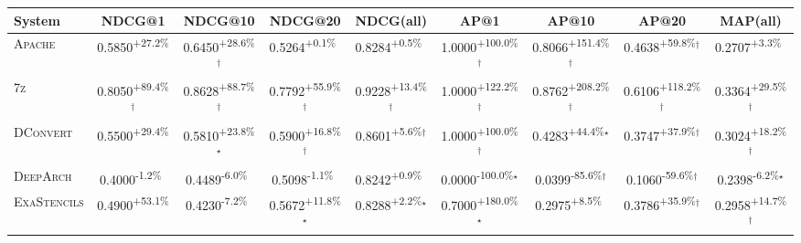 \begin{table}[htbp]
\centering
\renewcommand{\arraystretch}{1.2}
\begin{tabular}{l|cccc|cccc}
\hline
System & NDCG@1 & NDCG@10 & NDCG@20 & NDCG(all) & AP@1 & AP@10 & AP@20 & MAP(all) \\ \hline
\textsc{Apache} & \cellcolor{green!30}0.5850\textsuperscript{+27.2\%}$^{\,\,\,}$ & \cellcolor{green!30}0.6450\textsuperscript{+28.6\%}$^\dagger$ & \cellcolor{green!30}0.5264\textsuperscript{+0.1\%}$^{\,\,\,}$ & \cellcolor{green!30}0.8284\textsuperscript{+0.5\%}$^{\,\,\,}$ & \cellcolor{green!30}1.0000\textsuperscript{+100.0\%}$^\dagger$ & \cellcolor{green!30}0.8066\textsuperscript{+151.4\%}$^\dagger$ & \cellcolor{green!30}0.4638\textsuperscript{+59.8\%}$^\dagger$ & \cellcolor{green!30}0.2707\textsuperscript{+3.3\%}$^{\,\,\,}$ \\
\textsc{7z} & \cellcolor{green!30}0.8050\textsuperscript{+89.4\%}$^\dagger$ & \cellcolor{green!30}0.8628\textsuperscript{+88.7\%}$^\dagger$ & \cellcolor{green!30}0.7792\textsuperscript{+55.9\%}$^\dagger$ & \cellcolor{green!30}0.9228\textsuperscript{+13.4\%}$^\dagger$ & \cellcolor{green!30}1.0000\textsuperscript{+122.2\%}$^\dagger$ & \cellcolor{green!30}0.8762\textsuperscript{+208.2\%}$^\dagger$ & \cellcolor{green!30}0.6106\textsuperscript{+118.2\%}$^\dagger$ & \cellcolor{green!30}0.3364\textsuperscript{+29.5\%}$^\dagger$ \\
\textsc{DConvert} & \cellcolor{green!30}0.5500\textsuperscript{+29.4\%}$^{\,\,\,}$ & \cellcolor{green!30}0.5810\textsuperscript{+23.8\%}$^\star$ & \cellcolor{green!30}0.5900\textsuperscript{+16.8\%}$^\dagger$ & \cellcolor{green!30}0.8601\textsuperscript{+5.6\%}$^\dagger$ & \cellcolor{green!30}1.0000\textsuperscript{+100.0\%}$^\dagger$ & \cellcolor{green!30}0.4283\textsuperscript{+44.4\%}$^\star$ & \cellcolor{green!30}0.3747\textsuperscript{+37.9\%}$^\dagger$ & \cellcolor{green!30}0.3024\textsuperscript{+18.2\%}$^\dagger$ \\
\textsc{DeepArch} & \cellcolor{red!30}0.4000\textsuperscript{-1.2\%}$^{\,\,\,}$ & \cellcolor{red!30}0.4489\textsuperscript{-6.0\%}$^{\,\,\,}$ & \cellcolor{red!30}0.5098\textsuperscript{-1.1\%}$^{\,\,\,}$ & \cellcolor{green!30}0.8242\textsuperscript{+0.9\%}$^{\,\,\,}$ & \cellcolor{red!30}0.0000\textsuperscript{-100.0\%}$^\star$ & \cellcolor{red!30}0.0399\textsuperscript{-85.6\%}$^\dagger$ & \cellcolor{red!30}0.1060\textsuperscript{-59.6\%}$^\dagger$ & \cellcolor{red!30}0.2398\textsuperscript{-6.2\%}$^\star$ \\
\textsc{ExaStencils} & \cellcolor{green!30}0.4900\textsuperscript{+53.1\%}$^{\,\,\,}$ & \cellcolor{red!30}0.4230\textsuperscript{-7.2\%}$^{\,\,\,}$ & \cellcolor{green!30}0.5672\textsuperscript{+11.8\%}$^\star$ & \cellcolor{green!30}0.8288\textsuperscript{+2.2\%}$^\star$ & \cellcolor{green!30}0.7000\textsuperscript{+180.0\%}$^\star$ & \cellcolor{green!30}0.2975\textsuperscript{+8.5\%}$^{\,\,\,}$ & \cellcolor{green!30}0.3786\textsuperscript{+35.9\%}$^\dagger$ & \cellcolor{green!30}0.2958\textsuperscript{+14.7\%}$^\dagger$ \\

\end{tabular}
\end{table}
